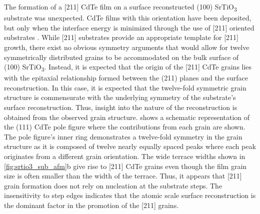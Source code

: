 The formation of a [211] CdTe film on a surface reconstructed (100) SrTiO\textsubscript{3} substrate was unexpected.
CdTe films with this orientation have been deposited, but only when the interface energy is minimized through the use of [211] oriented substrates \cite{Lange1991b,Million1996,Rujirawat1997a,Zanatta1998}.
While [211] substrates provide an appropriate template for [211] growth, there exist no obvious symmetry arguments that would allow for twelve symmetrically distributed grains to be accommodated on the bulk surface of (100) SrTiO\textsubscript{3}.
Instead, it is expected that the origin of the [211] CdTe grains lies with the epitaxial relationship formed between the (211) planes and the surface reconstruction.
In this case, it is expected that the twelve-fold symmetric grain structure is commensurate with the underlying symmetry of the substrate's surface reconstruction.
Thus, insight into the nature of the reconstruction is obtained from the observed grain structure.
 shows a schematic representation of the (111) CdTe pole figure where the contributions from each grain are shown.
The pole figure's inner ring demonstrates a twelve-fold symmetry in the grain structure as it is composed of twelve nearly equally spaced peaks where each peak originates from a different grain orientation.
The wide terrace widths shown in \cref{fig:srtio3_sub_afm}b give rise to [211] CdTe grains even though the film grain size is often smaller than the width of the terrace.
Thus, it appears that [211] grain formation does not rely on nucleation at the substrate steps.
The insensitivity to step edges indicates that the atomic scale surface reconstruction is the dominant factor in the promotion of the [211] grains.


